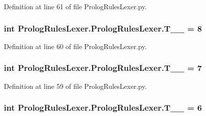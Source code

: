 Definition at line 61 of file Prolog\+Rules\+Lexer.\+py.

\hypertarget{class_prolog_rules_lexer_1_1_prolog_rules_lexer_a1d28a6546ce8a66389e42a9768b7b88b}{}
\subsubsection[{T\+\_\+\+\_\+1}]{\setlength{\rightskip}{0pt plus 5cm}int Prolog\+Rules\+Lexer.\+Prolog\+Rules\+Lexer.\+T\+\_\+\+\_ = 8\hspace{0.3cm}{\ttfamily [static]}}\label{class_prolog_rules_lexer_1_1_prolog_rules_lexer_a1d28a6546ce8a66389e42a9768b7b88b}


Definition at line 60 of file Prolog\+Rules\+Lexer.\+py.

\hypertarget{class_prolog_rules_lexer_1_1_prolog_rules_lexer_a8a043ea7c358f584213d18fcbc020d7f}{}
\subsubsection[{T\+\_\+\+\_\+2}]{\setlength{\rightskip}{0pt plus 5cm}int Prolog\+Rules\+Lexer.\+Prolog\+Rules\+Lexer.\+T\+\_\+\+\_ = 7\hspace{0.3cm}{\ttfamily [static]}}\label{class_prolog_rules_lexer_1_1_prolog_rules_lexer_a8a043ea7c358f584213d18fcbc020d7f}


Definition at line 59 of file Prolog\+Rules\+Lexer.\+py.

\hypertarget{class_prolog_rules_lexer_1_1_prolog_rules_lexer_a30d769d7e6e0d33ce068265a838e5652}{}
\subsubsection[{T\+\_\+\+\_\+3}]{\setlength{\rightskip}{0pt plus 5cm}int Prolog\+Rules\+Lexer.\+Prolog\+Rules\+Lexer.\+T\+\_\+\+\_ = 6\hspace{0.3cm}{\ttfamily [static]}}\label{class_prolog_rules_lexer_1_1_prolog_rules_lexer_a30d769d7e6e0d33ce068265a838e5652}


